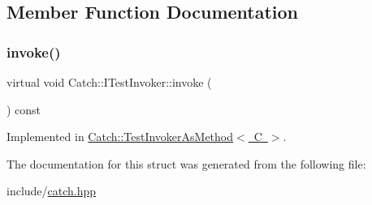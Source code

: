 \subsection{Member Function Documentation}
\mbox{\label{structCatch_1_1ITestInvoker_a6fcd5c5b67d6d5ade6491ff33411ca7f}} 
\subsubsection{\texorpdfstring{invoke()}{invoke()}}
{\footnotesize\ttfamily virtual void Catch\+::\+I\+Test\+Invoker\+::invoke (\begin{DoxyParamCaption}{ }\end{DoxyParamCaption}) const\hspace{0.3cm}{\ttfamily [pure virtual]}}



Implemented in \mbox{\hyperlink{classCatch_1_1TestInvokerAsMethod_a8115a06efe273f4112ec0b5452c1b5f2}{Catch\+::\+Test\+Invoker\+As\+Method$<$ C $>$}}.



The documentation for this struct was generated from the following file\+:\begin{DoxyCompactItemize}
\item 
include/\mbox{\hyperlink{catch_8hpp}{catch.\+hpp}}\end{DoxyCompactItemize}
